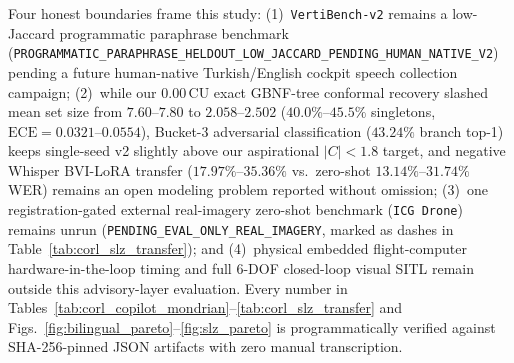\documentclass[10pt]{article}
\begin{document}
Four honest boundaries frame this study: (1)~\texttt{VertiBench-v2} remains a low-Jaccard programmatic paraphrase benchmark (\texttt{PROGRAMMATIC\_PARAPHRASE\_HELDOUT\_LOW\_JACCARD\_PENDING\_HUMAN\_NATIVE\_V2}) pending a future human-native Turkish/English cockpit speech collection campaign; (2)~while our $0.00$\,CU exact GBNF-tree conformal recovery slashed mean set size from $7.60$--$7.80$ to $2.058$--$2.502$ ($40.0\%$--$45.5\%$ singletons, $\text{ECE}=0.0321$--$0.0554$), Bucket-3 adversarial classification ($43.24\%$ branch top-1) keeps single-seed v2 slightly above our aspirational $|C|<1.8$ target, and negative Whisper BVI-LoRA transfer ($17.97\%$--$35.36\%$ vs.\ zero-shot $13.14\%$--$31.74\%$ WER) remains an open modeling problem reported without omission; (3)~one registration-gated external real-imagery zero-shot benchmark (\texttt{ICG~Drone}) remains unrun (\texttt{PENDING\_EVAL\_ONLY\_REAL\_IMAGERY}, marked as dashes in Table~\ref{tab:corl_slz_transfer}); and (4)~physical embedded flight-computer hardware-in-the-loop timing and full 6-DOF closed-loop visual SITL remain outside this advisory-layer evaluation. Every number in Tables~\ref{tab:corl_copilot_mondrian}--\ref{tab:corl_slz_transfer} and Figs.~\ref{fig:bilingual_pareto}--\ref{fig:slz_pareto} is programmatically verified against SHA-256-pinned JSON artifacts with zero manual transcription.



\end{document}
